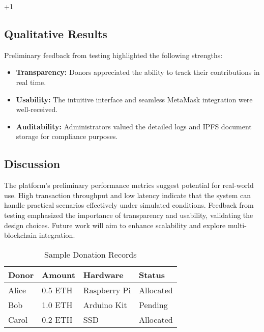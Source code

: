 +1\documentclass[conference]{IEEEtran}
\begin{document}
\subsection{Qualitative Results}
Preliminary feedback from testing highlighted the following strengths:
\begin{itemize}
    \item \textbf{Transparency:} Donors appreciated the ability to track their contributions in real time.
    \item \textbf{Usability:} The intuitive interface and seamless MetaMask integration were well-received.
    \item \textbf{Auditability:} Administrators valued the detailed logs and IPFS document storage for compliance purposes.
\end{itemize}

\subsection{Discussion}
The platform’s preliminary performance metrics suggest potential for real-world use. High transaction throughput and low latency indicate that the system can handle practical scenarios effectively under simulated conditions. Feedback from testing emphasized the importance of transparency and usability, validating the design choices. Future work will aim to enhance scalability and explore multi-blockchain integration.

\begin{table}[ht]
\caption{Sample Donation Records}
\centering
\begin{tabular}{|l|l|l|l|}
\hline
Donor & Amount & Hardware & Status \\
\hline
Alice & 0.5 ETH & Raspberry Pi & Allocated \\
Bob & 1.0 ETH & Arduino Kit & Pending \\
Carol & 0.2 ETH & SSD & Allocated \\
\hline
\end{tabular}
\label{tab:donations}
\end{table}

\end{document}
